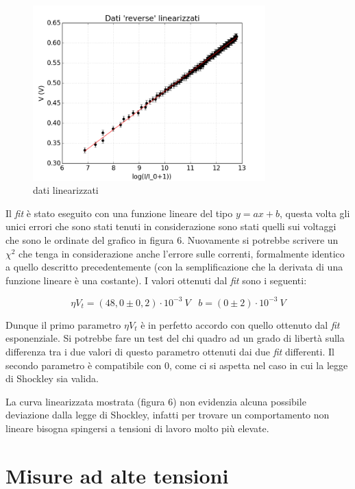\documentclass[a4paper,10pt]{article}
\begin{document}
\begin{figure}[!htb]
\begin{center}
\includegraphics[width=0.8\textwidth]{lin2.png}
\end{center}
\caption{dati linearizzati}
\end{figure}


Il \emph{fit} è stato eseguito con una funzione lineare del tipo $y = ax+b$, questa volta gli unici errori che sono stati tenuti in considerazione sono stati quelli sui voltaggi che sono le ordinate del grafico in figura 6. Nuovamente si potrebbe scrivere un $\chi^2$ che tenga in considerazione anche l'errore sulle correnti, formalmente identico a quello descritto precedentemente (con la semplificazione che la derivata di una funzione lineare è una costante).
I valori ottenuti dal \emph{fit} sono i seguenti:

\begin{equation}
\eta V_t = (48,0 \pm 0,2) \cdot 10^{-3}\:V\;\;\;b =(0 \pm 2) \cdot 10^{-3}\:V
\end{equation}

Dunque il primo parametro $\eta V_t$ è in perfetto accordo con quello ottenuto dal \emph{fit} esponenziale. Si potrebbe fare un test del chi quadro ad un grado di libertà sulla differenza tra i due valori di questo parametro ottenuti dai due \emph{fit} differenti. Il secondo parametro è compatibile con 0, come ci si aspetta nel caso in cui la legge di Shockley sia valida. 

La curva linearizzata mostrata (figura 6) non evidenzia alcuna possibile deviazione dalla legge di Shockley, infatti per trovare un comportamento non lineare bisogna spingersi a tensioni di lavoro molto più elevate.

\section{Misure ad alte tensioni}
\end{document}
